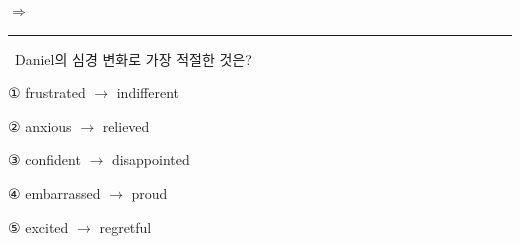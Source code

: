 \documentclass[11pt,a4paper]{article}
\newcommand{\qno}[1]{\par\vspace{8pt}\noindent{\sffamily\bfseries #1.}\ }
\newcommand{\instr}[1]{{\sffamily #1}\par\vspace{3pt}}
\begin{document}
\vspace{4pt}
\noindent $\Rightarrow$ \rule{\linewidth}{0.4pt}

\qno{4}\instr{Daniel의 심경 변화로 가장 적절한 것은?}
\begin{choices}
\item ① frustrated $\rightarrow$ indifferent
\item ② anxious $\rightarrow$ relieved
\item ③ confident $\rightarrow$ disappointed
\item ④ embarrassed $\rightarrow$ proud
\item ⑤ excited $\rightarrow$ regretful
\end{choices}
\end{document}
